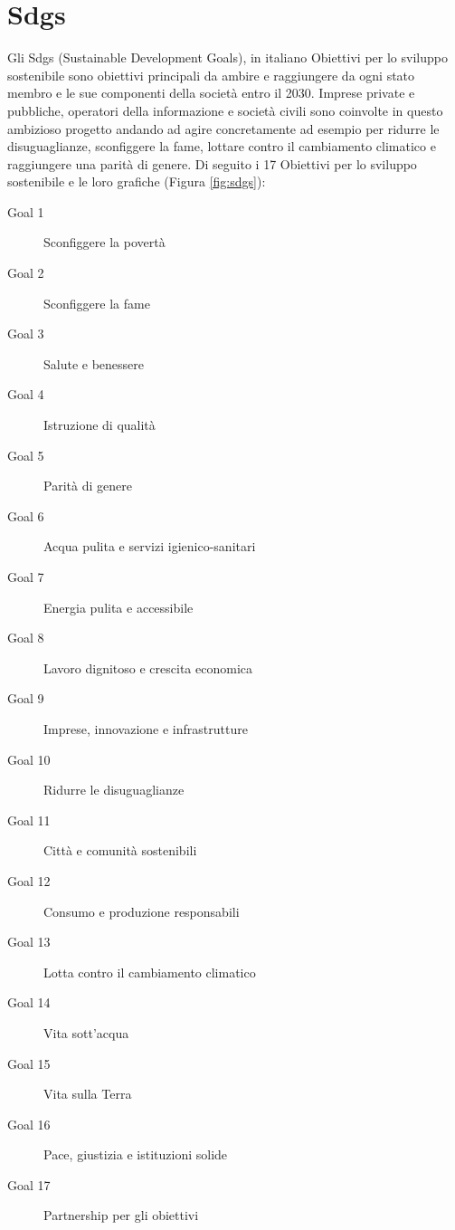 \section{Sdgs}
\label{sec:sdgs}
Gli Sdgs (Sustainable Development Goals)\cite{agenda2030}, in italiano Obiettivi per lo sviluppo sostenibile sono obiettivi principali da ambire e raggiungere da ogni stato membro e le sue componenti della società entro il 2030. Imprese private e pubbliche, operatori della informazione e società civili sono coinvolte in questo ambizioso progetto andando ad agire concretamente ad esempio per ridurre le disuguaglianze, sconfiggere la fame, lottare contro il cambiamento climatico e raggiungere una parità di genere.
Di seguito i 17 Obiettivi per lo sviluppo sostenibile e le loro grafiche (Figura \ref{fig:sdgs}):
\begin{description}
    \item[Goal 1] Sconfiggere la povertà
    \item[Goal 2] Sconfiggere la fame
    \item[Goal 3] Salute e benessere
    \item[Goal 4] Istruzione di qualità
    \item[Goal 5] Parità di genere
    \item[Goal 6] Acqua pulita e servizi igienico-sanitari
    \item[Goal 7]  Energia pulita e accessibile
    \item[Goal 8] Lavoro dignitoso e crescita economica
    \item[Goal 9]  Imprese, innovazione e infrastrutture
    \item[Goal 10] Ridurre le disuguaglianze
    \item[Goal 11] Città e comunità sostenibili
    \item[Goal 12] Consumo e produzione responsabili
    \item[Goal 13] Lotta contro il cambiamento climatico
    \item[Goal 14] Vita sott’acqua
    \item[Goal 15] Vita sulla Terra
    \item[Goal 16] Pace, giustizia e istituzioni solide
    \item[Goal 17] Partnership per gli obiettivi
\end{description}
%
